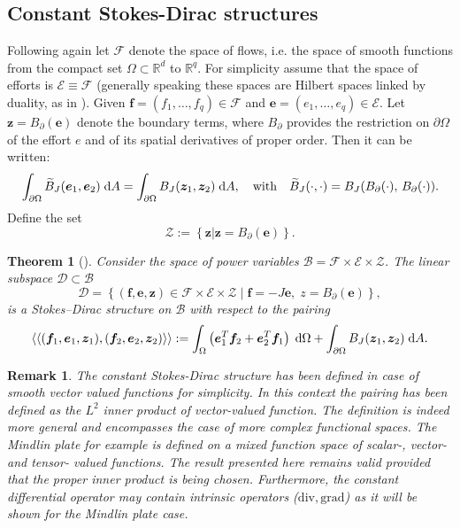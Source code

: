 \documentclass[11pt]{article}
\newtheorem{theorem}{Theorem}
\newtheorem{remark}{Remark}
\begin{document}
{		\subsection{Constant Stokes-Dirac structures}
		Following again \cite{MacchelliModelling} let $\mathcal{F}$ denote the space of flows, i.e. the space of smooth functions from the compact set $\Omega \subset \mathbb{R}^d$ to $\mathbb{R}^q$. For simplicity assume that  the space of efforts is $\mathcal{E} \equiv \mathcal{F}$ (generally speaking these spaces are Hilbert spaces linked by duality, as in \cite{Villegas}). Given $\bm{f} = (f_1, \dots, f_q) \in \mathcal{F}$ and $\bm{e} = (e_1, \dots, e_q) \in \mathcal{E}$. Let $\bm{z} = B_\partial(\bm{e})$ denote the boundary terms, where $B_\partial$ provides the restriction on $\partial\Omega$ of the effort $e$ and of its spatial derivatives of proper order. Then it can be written:
		\begin{equation}
		\int_{\partial \Omega} \widetilde{B}_J(\bm{e}_1, \bm{e}_2) \d{A} = \int_{\partial \Omega} B_J(\bm{z}_1, \bm{z}_2) \d{A}, \quad \text{with} \quad  \widetilde{B}_J(\cdot, \cdot) = B_J(B_{\partial}(\cdot), \, B_{\partial}(\cdot)).
		\end{equation}
		Define the set
		\begin{equation}
		\mathcal{Z} := \left\{ \bm{z} \vert \bm{z} = B_{\partial}(\bm{e})  \right\}.
		\end{equation}
		\begin{theorem}[\cite{MacchelliModelling}]
			\label{th:StokesDirac}
			Consider the space of power variables $\mathcal{B} = \mathcal{F} \times \mathcal{E} \times \mathcal{Z}$. The linear subspace $\mathcal{D} \subset \mathcal{B}$
			\begin{equation}
			\mathcal{D} = \left\{ (\bm{f}, \bm{e}, \bm{z}) \in  \mathcal{F} \times \mathcal{E} \times \mathcal{Z} \; \vert \; \bm{f} = -J \bm{e}, \; z = B_\partial(\bm{e}) \right\},
			\end{equation}
			is a Stokes–Dirac structure on $\mathcal{B}$ with respect to the pairing
			\begin{equation}
			\left\langle \left\langle (\bm{f}_1, \bm{e}_1, \bm{z}_1), (\bm{f}_2, \bm{e}_2, \bm{z}_2) \right\rangle \right\rangle  := \int_{\Omega} \left( \bm{e}_1^T \bm{f}_2 + \bm{e}_2^T \bm{f}_1 \right) \d\Omega + \int_{\partial \Omega} B_J(\bm{z}_1, \bm{z}_2) \d{A}.
			\end{equation}
		\end{theorem}
		\begin{remark}
			The constant Stokes-Dirac structure has been defined in case of smooth vector valued functions for simplicity. In this context the pairing has been defined as the $L^2$ inner product of vector-valued function. The definition is indeed more general and encompasses the case of more complex functional spaces. The Mindlin plate for example is defined on a mixed function space of scalar-, vector- and tensor- valued functions. The result presented here remains valid provided that the proper inner product is being chosen. Furthermore, the constant differential operator may contain intrinsic operators ($\mathrm{div}, \mathrm{grad}$) as it will be shown for the Mindlin plate case.
		\end{remark}
	}
	
\end{document}
